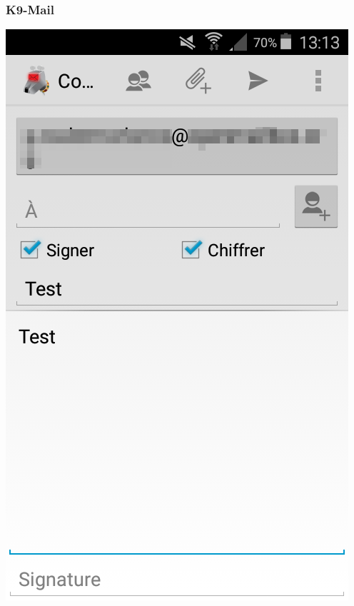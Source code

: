 \documentclass{beamer}
\begin{document}
\begin{frame}
\frametitle{K9-Mail }
\centering
    	\includegraphics[keepaspectratio, scale=0.25]{figures/K90.png}
\end{frame}
\end{document}
